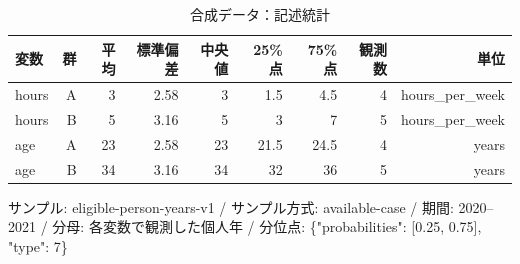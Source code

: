 \begin{table}[htbp]
\centering
\begin{tabular}{lrrrrrrrr}
\hline
変数 & 群 & 平均 & 標準偏差 & 中央値 & 25\%点 & 75\%点 & 観測数 & 単位 \\
\hline
hours & A & 3 & 2.58 & 3 & 1.5 & 4.5 & 4 & hours\_per\_week \\
hours & B & 5 & 3.16 & 5 & 3 & 7 & 5 & hours\_per\_week \\
age & A & 23 & 2.58 & 23 & 21.5 & 24.5 & 4 & years \\
age & B & 34 & 3.16 & 34 & 32 & 36 & 5 & years \\
\hline
\end{tabular}
\caption{合成データ：記述統計}
\par\small サンプル: eligible-person-years-v1 / サンプル方式: available-case / 期間: 2020–2021 / 分母: 各変数で観測した個人年 / 分位点: \{"probabilities": [0.25, 0.75], "type": 7\}
\end{table}
